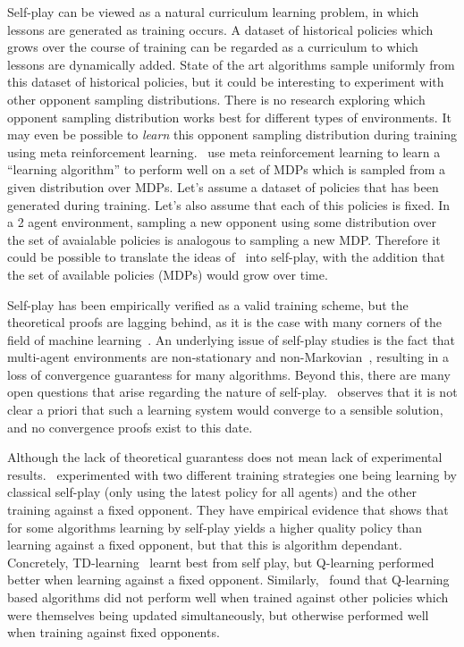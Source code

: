 \documentclass{../main.tex}{}
\begin{document}
Self-play can be viewed as a natural curriculum learning problem, in which lessons are generated as training occurs. A dataset of historical policies which grows over the course of training can be regarded as a curriculum to which lessons are dynamically added. State of the art algorithms sample uniformly from this dataset of historical policies, but it could be interesting to experiment with other opponent sampling distributions. There is no research exploring which opponent sampling distribution works best for different types of environments. It may even be possible to \textit{learn} this opponent sampling distribution during training using meta reinforcement learning.~\cite{Duan2016} use meta reinforcement learning to learn a ``learning algorithm'' to perform well on a set of MDPs which is sampled from a given distribution over MDPs. Let's assume a dataset of policies that has been generated during training. Let's also assume that each of this policies is fixed. In a 2 agent environment, sampling a new opponent using some distribution over the set of avaialable policies is analogous to sampling a new MDP. Therefore it could be possible to translate the ideas of~\citep{Duan2016} into self-play, with the addition that the set of available policies (MDPs) would grow over time.

Self-play has been empirically verified as a valid training scheme, but the theoretical proofs are lagging behind, as it is the case with many corners of the field of machine learning~\citep{Henderson2017, Lipton2018}. An underlying issue of self-play studies is the fact that multi-agent environments are non-stationary and non-Markovian~\citep{Laurent2011}, resulting in a loss of convergence guarantess for many algorithms. Beyond this, there are many open questions that arise regarding the nature of self-play.~\cite{Tesauro1992} observes that it is not clear a priori that such a learning system would converge to a sensible solution, and no convergence proofs exist to this date. 

Although the lack of theoretical guarantess does not mean lack of experimental results.~\citep{VanDerRee2013} experimented with two different training strategies one being learning by classical self-play (only using the latest policy for all agents) and the other training against a fixed opponent. They have empirical evidence that shows that for some algorithms learning by self-play yields a higher quality policy than learning against a fixed opponent, but that this is algorithm dependant. Concretely, TD-learning~\citep{Sutton1998} learnt best from self play, but Q-learning performed better when learning against a fixed opponent. Similarly,~\citep{Firoiu2017} found that Q-learning based algorithms did not perform well when trained against other policies which were themselves being updated simultaneously, but otherwise performed well when training against fixed opponents.
\end{document}
